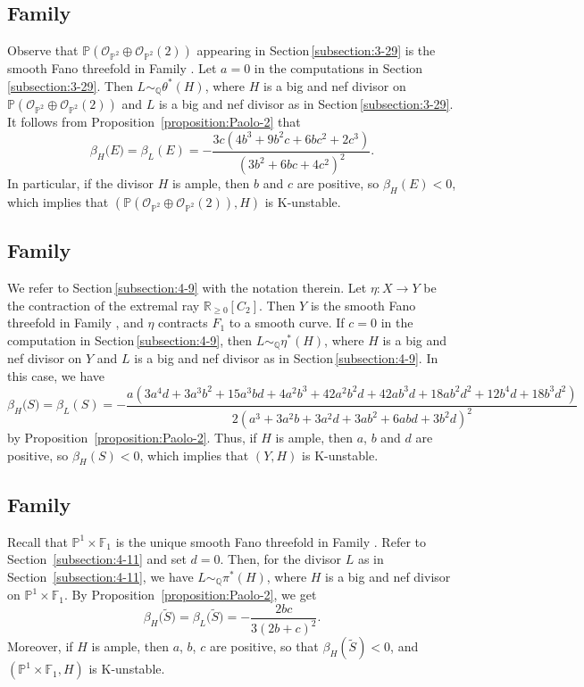 \documentclass[12pt]{amsart}
\theoremstyle{definition}
\theoremstyle{remark}
\begin{document}
\subsection{Family }
\label{subsection:2-36}
Observe that $\mathbb{P}(\mathcal{O}_{\mathbb{P}^2}\oplus\mathcal{O}_{\mathbb{P}^2}(2))$ appearing in Section\,\ref{subsection:3-29} is the smooth Fano threefold in Family .
Let $a=0$ in the computations in Section\,\ref{subsection:3-29}. Then $L\sim_{\mathbb{Q}} \theta^*(H)$,
where $H$ is a big and nef divisor on $\mathbb{P}(\mathcal{O}_{\mathbb{P}^2}\oplus\mathcal{O}_{\mathbb{P}^2}(2))$ and $L$
is a big and nef divisor  as in Section\,\ref{subsection:3-29}. It follows from  Proposition~\ref{proposition:Paolo-2} that
$$
\beta_H\big(E\big)=\beta_L(E)=-\frac{3c(4b^3+9b^2c+6bc^2+2c^3)}{(3b^2+6bc+4c^2)^2}.
$$
In particular, if the divisor $H$ is ample, then $b$ and $c$ are positive, so $\beta_H(E)<0$, which implies that $(\mathbb{P}(\mathcal{O}_{\mathbb{P}^2}\oplus\mathcal{O}_{\mathbb{P}^2}(2)),H)$ is K-unstable.

\subsection{Family }
\label{subsection:3-26}
We refer to Section\,\ref{subsection:4-9} with the notation therein.
Let $\eta\colon X\to Y$ be the contraction of the extremal ray $\mathbb{R}_{\geqslant 0}[C_2]$.
Then $Y$ is the smooth Fano threefold in Family , and $\eta$ contracts $F_1$ to a smooth curve.
If $c=0$ in the computation in Section\,\ref{subsection:4-9}, then $L\sim_{\mathbb{Q}} \eta^*(H)$,
where $H$ is a big and nef divisor on $Y$ and $L$ is a big and nef divisor as in Section\,\ref{subsection:4-9}. In this case, we have
$$
\beta_H\big(S\big)=\beta_L(S)=-\frac{a(3a^4d+3a^3b^2+15a^3bd+4a^2b^3+42a^2b^2d+42ab^3d+18ab^2d^2+12b^4d+18b^3d^2)}{2(a^3+3a^2b+3a^2d+3ab^2+6abd+3b^2d)^2}
$$
by Proposition~\ref{proposition:Paolo-2}. Thus, if $H$ is ample, then $a$, $b$ and $d$ are positive, so $\beta_H(S)<0$, which implies that $(Y,H)$ is K-unstable.

\subsection{Family }
\label{subsection:3-28}
Recall that $\mathbb{P}^1\times\mathbb{F}_1$ is the unique smooth Fano threefold in Family . Refer to Section~\ref{subsection:4-11} and set
 $d=0$. Then, for the divisor $L$ as in Section~\ref{subsection:4-11}, we have $L\sim_{\mathbb{Q}} \pi^*(H)$,
where $H$ is a big and nef divisor on $\mathbb{P}^1\times\mathbb{F}_1$. By Proposition~\ref{proposition:Paolo-2}, we get
$$
\beta_H\big(\widetilde{S}\big)=\beta_L\big(\widetilde{S}\big)=-\frac{2bc}{3(2b+c)^2}.
$$
Moreover, if $H$ is ample, then $a$, $b$, $c$ are positive, so that $\beta_H(\widetilde{S})<0$, and $(\mathbb{P}^1\times\mathbb{F}_1,H)$ is K-unstable.
\end{document}
